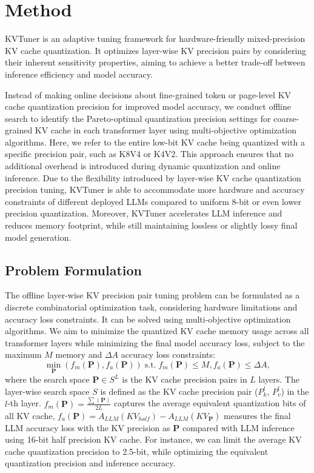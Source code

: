 \section{Method}
\label{sec:kvtuner}
KVTuner is an adaptive tuning framework for hardware-friendly mixed-precision KV cache quantization. It optimizes layer-wise KV precision pairs by considering their inherent sensitivity properties, aiming to achieve a better trade-off between inference efficiency and model accuracy.

Instead of making online decisions about fine-grained token or page-level KV cache quantization precision for improved model accuracy, we conduct offline search to identify the Pareto-optimal quantization precision settings for coarse-grained KV cache in each transformer layer using multi-objective optimization algorithms. Here, we refer to the entire low-bit KV cache being quantized with a specific precision pair, such as K8V4 or K4V2. This approach ensures that no additional overhead is introduced during dynamic quantization and online inference.
Due to the flexibility introduced by layer-wise KV cache quantization precision tuning, KVTuner is able to accommodate more hardware and accuracy constraints of different deployed LLMs compared to uniform 8-bit or even lower precision quantization. Moreover, KVTuner accelerates LLM inference and reduces memory footprint, while still maintaining lossless or slightly lossy final model generation.

\subsection{Problem Formulation}
The offline layer-wise KV precision pair tuning problem can be formulated as a discrete combinatorial optimization task, considering hardware limitations and accuracy loss constraints. It can be solved using multi-objective optimization algorithms.
We aim to minimize the quantized KV cache memory usage across all transformer layers while minimizing the final model accuracy loss, subject to the maximum $M$ memory and $\Delta A$ accuracy loss constraints:
\begin{equation}
\!\!\!\min_{\mathbf{P}}\left(f_m(\mathbf{P}), f_a(\mathbf{P})\right) \;  \mbox{s.t.} \; f_m(\mathbf{P}) \leq M, f_a(\mathbf{P}) \leq \Delta A,
\end{equation}
where the search space $\mathbf{P} \in S^{L}$ is the KV cache precision pairs in $L$ layers. The layer-wise search space $S$ is defined as the KV cache precision pair ($P^l_k$, $P^l_v$) in the $l$-th layer. $f_m(\mathbf{P}) = \frac{\sum(\mathbf{P})}{2L}$ captures the average equivalent quantization bits of all KV cache, $f_a(\mathbf{P}) = A_{LLM}(KV_{half}) - A_{LLM}(KV_{\mathbf{P}})$ measures the final LLM accuracy loss with the KV precision as $\mathbf{P}$ compared with LLM inference using 16-bit half precision KV cache. For instance, we can limit the average KV cache quantization precision to 2.5-bit, while optimizing the equivalent quantization precision and inference accuracy.

